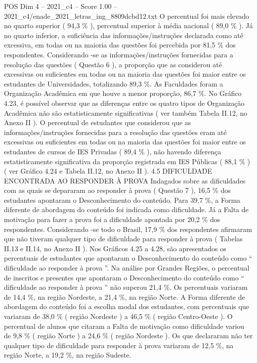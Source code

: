\begin{textsample}{POS Dim 4 – 2021\_c4 – Score 1.00 – 2021\_c4/enade\_2021\_letras\_ing\_8809dcbd12.txt}
O percentual foi mais elevado no quarto superior ( 94,3 \% ), percentual superior à média nacional ( 89,0 \% ).
Já no quarto inferior, a suficiência das informações/instruções declarada como até excessiva, em todas ou na maioria das questões foi percebida por 81,5 \% dos respondentes.
Considerando -se as informações/instruções fornecidas para a resolução das questões ( Questão 6 ), a proporção que as considerou até excessivas ou suficientes em todas ou na maioria das questões foi maior entre os estudantes de Universidades, totalizando 89,3 \%.
As Faculdades foram a Organização Acadêmica em que houve a menor proporção, 86,7 \%.
No Gráfico 4.23, é possível observar que as diferenças entre os quatro tipos de Organização Acadêmica não são estatisticamente significativas ( ver também Tabela II.12, no Anexo II ).
O percentual de estudantes que considerou que as informações/instruções fornecidas para a resolução das questões eram até excessivas ou suficientes em todas ou na maioria das questões foi maior entre os estudantes de cursos de IES Privadas ( 89,4 \% ), não havendo diferença estatisticamente significativa da proporção registrada em IES Públicas ( 88,1 \% ) ( ver Gráfico 4.24 e Tabela II.12, no Anexo II ). 4.5 DIFICULDADE ENCONTRADA AO RESPONDER À PROVA Indagados sobre as dificuldades com as quais se depararam ao responder à prova ( Questão 7 ), 16,5 \% dos estudantes apontaram o Desconhecimento do conteúdo.
Para 39,7 \%, a Forma diferente de abordagem do conteúdo foi indicada como dificuldade.
Já a Falta de motivação para fazer a prova foi a dificuldade apontada por 20,2 \% dos respondentes.
Considerando -se todo o Brasil, 17,9 \% dos respondentes afirmaram que não tiveram qualquer tipo de dificuldade para responder à prova ( Tabelas II.13 e II.14, no Anexo II ).
Nos Gráficos 4.25 a 4.28, são apresentados os percentuais de estudantes que apontaram o Desconhecimento do conteúdo como “ dificuldade ao responder à prova ”.
Na análise por Grandes Regiões, o percentual de inscritos e presentes que apontaram o Desconhecimento do conteúdo como “ dificuldade ao responder à prova ” não superou 21,4 \%.
Os percentuais variaram de 14,4 \%, na região Nordeste, a 21,4 \%, na região Norte.
A Forma diferente de abordagem do conteúdo foi a escolha modal dos estudantes, com percentuais que variaram de 38,0 \% ( região Nordeste ) a 46,5 \% ( região Centro-Oeste ).
O percentual de alunos que citaram a Falta de motivação como dificuldade variou de 9,8 \% ( região Norte ) a 24,6 \% ( região Nordeste ).
Os que declararam não ter qualquer tipo de dificuldade para responder à prova variaram de 12,5 \%, na região Norte, a 19,2 \%, na região Sudeste.

\end{textsample}

